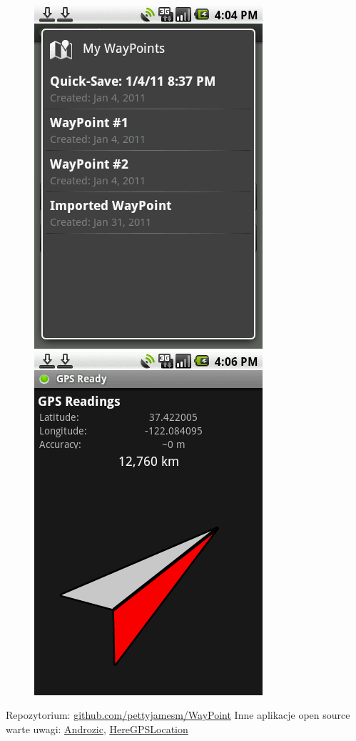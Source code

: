 \begin{figure}[H]
\includegraphics[scale=0.5]{czlonkowie/3/3waypoint.png}
\includegraphics[scale=0.5]{czlonkowie/3/4waypoint.png}
\end{figure}

Repozytorium: {\color{blue}\underline{\href{https://github.com/pettyjamesm/WayPoint}{github.com/pettyjamesm/WayPoint}}}
\newline \newline
Inne aplikacje open source warte uwagi: {\color{blue}\underline{\href{https://github.com/andreynovikov/Androzic}{Androzic}}}, {\color{blue}\underline{\href{https://github.com/borneq/HereGPSLocation}{HereGPSLocation}}}

